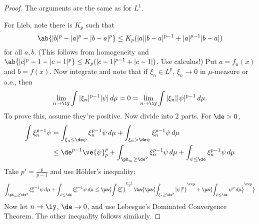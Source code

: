 \begin{proof}
The arguments are the same as for $L^1$. 

For Lieb,  note there is $K_p$ such that \[\ab{|b|^p-|a|^p-|b-a|^p}\le K_p(|a||b-a|^{p-1}+|a|^{p-1}|b-a|)\] for all $a,b$. (This follows from homogeneity and $\ab{|c|^p-1-|c-1|^p}\le K_p(|c-1|^{p-1}+|c-1|)$. Use calculus!) Put $a=f_n(x)$ and $b=f(x)$. Now integrate and note that 
if $\xi_n\in L^p$, $\xi_n\to 0$ in $\mu$-measure or a.e., then 
\[
 \lim_{n\to \iy}\int |\xi_{n}|^{p-1} |\psi|\,d\mu=0=\lim_{n\to \iy } \int |\xi_n||\psi|^{p-1}\,d\mu.
\]
To prove this, assume they're positive. Now divide into 2 parts. For $\de>0$,
\begin{align*}
\int \xi_n^{p-1}\psi &=\int_{\xi_n\le \de\psi} \xi_n^{p-1}\psi\,d\mu+\int_{\xi_n>\de\psi} \xi_n^{p-1} \psi\,d\mu\\
&\le \de^{p-1} \ve{\psi}_p^p
+\int_{\ph_m\ge\de^2} \xi_n^{p-1}\psi\,d\mu+\int_{\psi\le \de}\xi_n^{p-1} \psi\,d\mu
\end{align*}
Take $p'=\frac{p}{p-1}$ and use H\"older's inequality:
\[
\int_{\ph_m\ge\de^2} \xi_n^{p-1}\psi\,d\mu+\int_{\psi\le \de}\xi_n^{p-1} \psi\,d\mu
\le \pa{\int \xi_n^p}^{\frac{p-1}{p}}\ba{\pa{\int_{\xi_n\ge \de^2}|\psi|^p}^{\rc p}+\pa{\int_{\psi\le \de}\psi^p\,d\mu}^{\rc p}}
\]
Now let $n\to\iy$, $\de\to 0$, and use Lebesgue's Dominated Convergence Theorem. The other inequality follows similarly.
\end{proof}